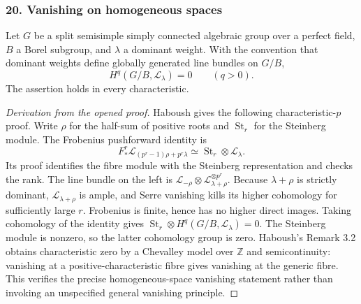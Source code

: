 \subsubsection{20. Vanishing on homogeneous spaces}
\begin{theorem}\label{B:subject20}
Let $G$ be a split semisimple simply connected algebraic group over a perfect field, $B$ a Borel subgroup, and $\lambda$ a dominant weight. With the convention that dominant weights define globally generated line bundles on $G/B$,
\[
 H^q(G/B,\mathcal L_\lambda)=0\qquad(q>0).
\]
The assertion holds in every characteristic.
\end{theorem}
\begin{proof}[Derivation from the opened proof]
Haboush \cite[Theorems 2.1 and 3.1]{BHaboush1980} gives the following characteristic-$p$ proof. Write $\rho$ for the half-sum of positive roots and $\operatorname{St}_r$ for the Steinberg module. The Frobenius pushforward identity is
\[
 F^r_*\mathcal L_{(p^r-1)\rho+p^r\lambda}
 \simeq\operatorname{St}_r\otimes\mathcal L_\lambda.
\]
Its proof identifies the fibre module with the Steinberg representation and checks the rank. The line bundle on the left is
$\mathcal L_{-\rho}\otimes\mathcal L_{\lambda+\rho}^{\otimes p^r}$.
Because $\lambda+\rho$ is strictly dominant, $\mathcal L_{\lambda+\rho}$ is ample, and Serre vanishing kills its higher cohomology for sufficiently large $r$. Frobenius is finite, hence has no higher direct images. Taking cohomology of the identity gives $\operatorname{St}_r\otimes H^q(G/B,\mathcal L_\lambda)=0$. The Steinberg module is nonzero, so the latter cohomology group is zero. Haboush's Remark 3.2 obtains characteristic zero by a Chevalley model over $\mathbb Z$ and semicontinuity: vanishing at a positive-characteristic fibre gives vanishing at the generic fibre. This verifies the precise homogeneous-space vanishing statement rather than invoking an unspecified general vanishing principle.
\end{proof}

